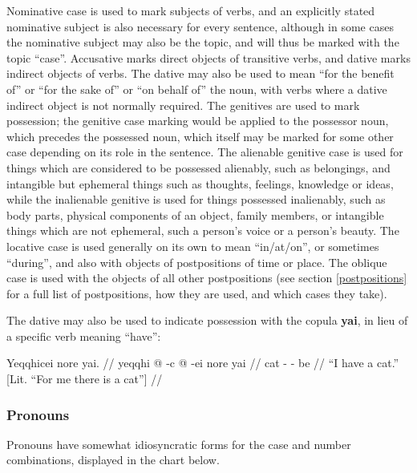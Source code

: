 \documentclass{article}
\begin{document}
Nominative case is used to mark subjects of verbs, and an explicitly stated nominative subject is also necessary for every sentence, although in some cases the nominative subject may also be the topic, and will thus be marked with the topic ``case''. Accusative marks direct objects of transitive verbs, and dative marks indirect objects of verbs. The dative may also be used to mean ``for the benefit of'' or ``for the sake of'' or ``on behalf of'' the noun, with verbs where a dative indirect object is not normally required.  The genitives are used to mark possession; the genitive case marking would be applied to the possessor noun, which precedes the possessed noun, which itself may be marked for some other case depending on its role in the sentence. The alienable genitive case is used for things which are considered to be possessed alienably, such as belongings, and intangible but ephemeral things such as thoughts, feelings, knowledge or ideas, while the inalienable genitive is used for things possessed inalienably, such as body parts, physical components of an object, family members, or intangible things which are not ephemeral, such a person's voice or a person's beauty.  The locative case is used generally on its own to mean ``in/at/on'', or sometimes ``during'', and also with objects of postpositions of time or place.  The oblique case is used with the objects of all other postpositions (see section \ref{postpositions} for a full list of postpositions, how they are used, and which cases they take).

The dative may also be used to indicate possession with the copula \textbf{yai}, in lieu of a specific verb meaning ``have'':

\ex[lingstyle=QuCheanya] \begingl
\glpreamble Yeqqhicei nore yai. //
\gla yeqqhi @ -c @ -ei nore yai //
\glb cat - -  be //
\glft ``I have a cat.'' [Lit. ``For me there is a cat''] //
\endgl \xe

\subsubsection{Pronouns}

Pronouns have somewhat idiosyncratic forms for the case and number combinations, displayed in the chart below.
\end{document}
